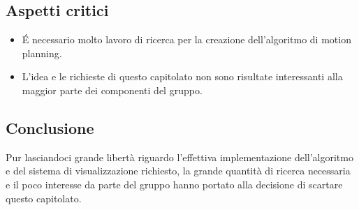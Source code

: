 \subsection{Aspetti critici}
\begin{itemize}
\item É necessario molto lavoro di ricerca per la creazione dell'algoritmo di motion planning.
\item L'idea e le richieste di questo capitolato non sono risultate interessanti alla maggior parte dei componenti del gruppo.
\end{itemize}

\subsection{Conclusione}
Pur lasciandoci grande libertà riguardo l'effettiva implementazione dell'algoritmo e del sistema di visualizzazione richiesto, la grande quantità di ricerca necessaria e il poco interesse da parte del gruppo hanno portato alla decisione di scartare questo capitolato.